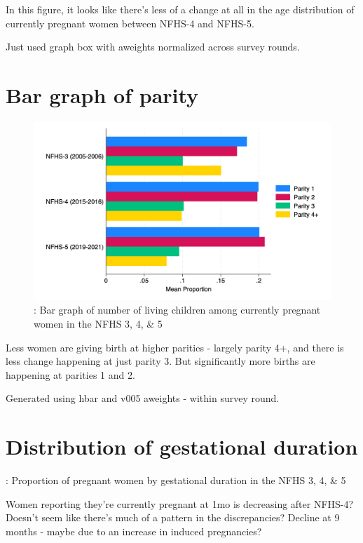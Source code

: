 \documentclass{article}
\begin{document}
In this figure, it looks like there's less of a change at all in the age distribution of currently pregnant women between NFHS-4 and NFHS-5. 

Just used graph box with aweights normalized across survey rounds. 

\section{Bar graph of parity}

\begin{figure}[H]
    \centering
    \includegraphics[width=\textwidth]{figures/bar graph number of children.png}
    \caption{: Bar graph of number of living children among currently pregnant women in the NFHS 3, 4, \& 5}
\end{figure}

Less women are giving birth at higher parities - largely parity 4+, and there is less change happening at just parity 3. But significantly more births are happening at parities 1 and 2.

Generated using hbar and v005 aweights - within survey round.

\section{Distribution of gestational duration}

\begin{table}[H]
    \centering
    \caption{: Proportion of pregnant women by gestational duration in the NFHS 3, 4, \& 5}
    \label{tab:sumstat}
\end{table}

Women reporting they're currently pregnant at 1mo is decreasing after NFHS-4? 
Doesn't seem like there's much of a pattern in the discrepancies?
Decline at 9 months - maybe due to an increase in induced pregnancies?
\end{document}
